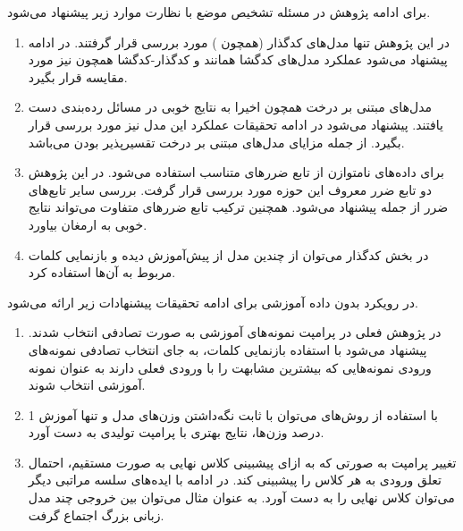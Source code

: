 برای ادامه پژوهش در مسئله تشخیص موضع با نظارت موارد زیر پیشنهاد می‌شود.
\begin{enumerate}
	\item 
در این پژوهش تنها مدل‌های کدگذار (همچون
)
مورد بررسی قرار گرفتند. در ادامه پیشنهاد می‌شود عملکرد مدل‌های کدگشا همانند
و کدگذار-کدگشا همچون
نیز مورد مقایسه قرار بگیرد.

\item
مدل‌های مبتنی بر درخت همچون
اخیرا به نتایج خوبی در مسائل رده‌بندی دست یافتند. پیشنهاد می‌شود در ادامه تحقیقات عملکرد این مدل نیز مورد بررسی قرار بگیرد. از جمله مزایای مدل‌های مبتنی بر درخت تقسیرپذیر بودن می‌باشد.

\item
برای داده‌های نامتوازن از تابع‌ ضررهای متناسب استفاده می‌شود. در این پژوهش دو تابع ضرر معروف این حوزه مورد بررسی قرار گرفت. بررسی سایر تابع‌های ضرر از جمله
پیشنهاد می‌شود. همچنین ترکیب تابع ضررهای متفاوت می‌تواند نتایج خوبی به ارمغان بیاورد.

\item در بخش کدگذار می‌توان از چندین مدل از پیش‌آموزش دیده و 
بازنمایی کلمات مربوط به آن‌ها استفاده کرد. 

\end{enumerate}


در رویکرد بدون داده‌ آموزشی برای ادامه تحقیقات پیشنهادات زیر ارائه می‌شود.
\begin{enumerate}
	\item
	در پژوهش فعلی در پرامپت
	نمونه‌های آموزشی به صورت تصادفی انتخاب شدند. پیشنهاد می‌شود با استفاده بازنمایی کلمات، به جای انتخاب تصادفی نمونه‌های ورودی نمونه‌هایی که بیشترین مشابهت را با ورودی فعلی دارند به عنوان نمونه آموزشی انتخاب شوند. 
		\item
		با استفاده از روش‌های 
		می‌توان با ثابت نگه‌داشتن وزن‌های مدل و تنها آموزش 1 درصد وزن‌ها، نتایج بهتری با پرامپت تولیدی به دست آورد.
		
		
		\item تغییر پرامپت به صورتی که به ازای پیشبینی کلاس نهایی به صورت مستقیم، احتمال تعلق ورودی به هر کلاس را پیشبینی کند. در ادامه با ایده‌های سلسه مراتبی دیگر می‌توان کلاس نهایی را به دست آورد. به عنوان مثال می‌توان بین خروجی چند مدل زبانی بزرگ اجتماع گرفت.

\end{enumerate}



